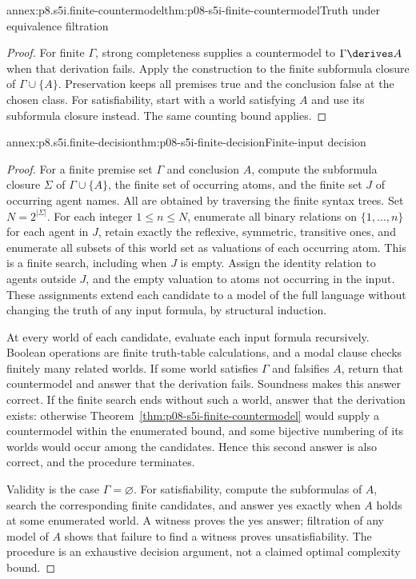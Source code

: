 \begin{annexitem}{annex:p8.s5i.finite-countermodel}{thm:p08-s5i-finite-countermodel}{Truth under equivalence filtration}
\begin{proof}
For finite \(\Gamma\), strong completeness supplies a countermodel to
\(\Gamma\derives A\) when that derivation fails. Apply the construction
to the finite subformula closure of \(\Gamma\cup\{A\}\).
Preservation keeps all premises true and the conclusion false at the
chosen class. For satisfiability, start with a world satisfying \(A\)
and use its subformula closure instead. The same counting bound applies.
\end{proof}
\end{annexitem}

\begin{annexitem}{annex:p8.s5i.finite-decision}{thm:p08-s5i-finite-decision}{Finite-input decision}
\begin{proof}
For a finite premise set \(\Gamma\) and conclusion \(A\), compute
the subformula closure \(\Sigma\) of \(\Gamma\cup\{A\}\), the
finite set of occurring atoms, and the finite set \(J\) of occurring
agent names. All are obtained by traversing the finite syntax trees. Set
\(N=2^{\lvert\Sigma\rvert}\). For each integer \(1\leq n\leq N\),
enumerate all binary relations on \(\{1,\ldots,n\}\) for each agent
in \(J\), retain exactly the reflexive, symmetric, transitive ones,
and enumerate all subsets of this world set as valuations of each
occurring atom. This is a finite search, including when \(J\) is empty.
Assign the identity relation to agents outside \(J\), and the empty
valuation to atoms not occurring in the input. These assignments extend
each candidate to a model of the full language without changing the
truth of any input formula, by structural induction.

At every world of each candidate, evaluate each input formula recursively.
Boolean operations are finite truth-table calculations, and a modal clause
checks finitely many related worlds. If some world satisfies \(\Gamma\)
and falsifies \(A\), return that countermodel and answer that the
derivation fails. Soundness makes this answer correct. If the finite
search ends without such a world, answer that the derivation exists:
otherwise Theorem~\ref{thm:p08-s5i-finite-countermodel} would supply a
countermodel within the enumerated bound, and some bijective numbering of
its worlds would occur among the candidates. Hence this second answer is
also correct, and the procedure terminates.

Validity is the case \(\Gamma=\varnothing\). For satisfiability, compute
the subformulas of \(A\), search the corresponding finite candidates,
and answer yes exactly when \(A\) holds at some enumerated world. A
witness proves the yes answer; filtration of any model of \(A\) shows
that failure to find a witness proves unsatisfiability. The procedure is
an exhaustive decision argument, not a claimed optimal complexity bound.
\end{proof}
\end{annexitem}
